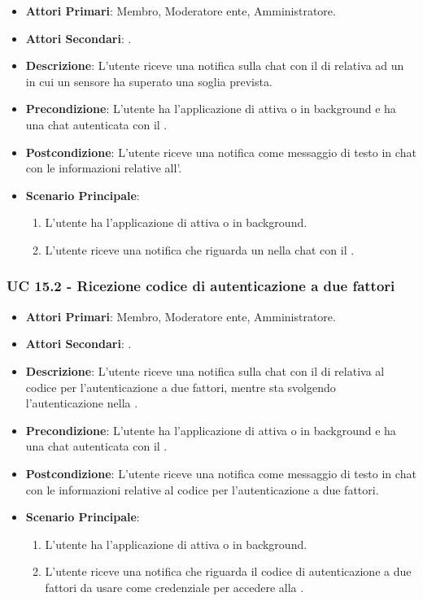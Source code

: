 	\begin{itemize}
		\item \textbf{Attori Primari}: Membro, Moderatore ente, Amministratore.
		\item \textbf{Attori Secondari}: .
		\item \textbf{Descrizione}: L'utente riceve una notifica sulla chat con il  di  relativa ad un  in cui un sensore ha superato una soglia prevista.
		\item \textbf{Precondizione}: L'utente ha l'applicazione di  attiva o in background e ha una chat autenticata con il .
		\item \textbf{Postcondizione}: L'utente riceve una notifica come messaggio di testo in chat con le informazioni relative all'.
		\item \textbf{Scenario Principale}:
		\begin{enumerate}
			\item L'utente ha l'applicazione di  attiva o in background.
			\item L'utente riceve una notifica che riguarda un  nella chat con il .
		\end{enumerate}
	\end{itemize}

	\subsubsection{UC 15.2 - Ricezione codice di autenticazione a due fattori}

	\begin{itemize}
		\item \textbf{Attori Primari}: Membro, Moderatore ente, Amministratore.
		\item \textbf{Attori Secondari}: .
		\item \textbf{Descrizione}: L'utente riceve una notifica sulla chat con il  di  relativa al codice per l'autenticazione a due fattori, mentre sta svolgendo l'autenticazione nella .
		\item \textbf{Precondizione}: L'utente ha l'applicazione di  attiva o in background e ha una chat autenticata con il .
		\item \textbf{Postcondizione}: L'utente riceve una notifica come messaggio di testo in chat con le informazioni relative al codice per l'autenticazione a due fattori.
		\item \textbf{Scenario Principale}:
		\begin{enumerate}
			\item L'utente ha l'applicazione di  attiva o in background.
			\item L'utente riceve una notifica che riguarda il codice di autenticazione a due fattori da usare come credenziale per accedere alla .
		\end{enumerate}
	\end{itemize}